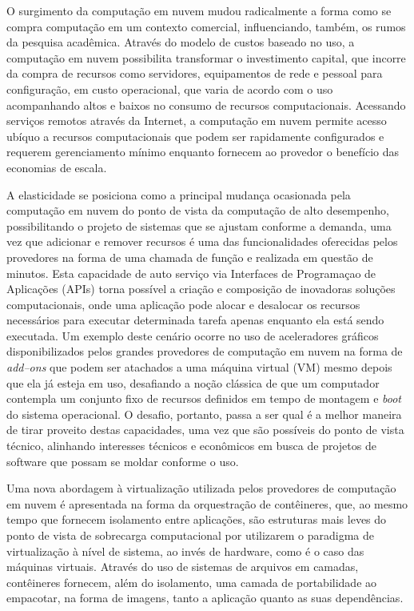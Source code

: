 \documentclass[english,brazilian]{UNISINOSmonografia} %
\begin{document}
O surgimento da computação em nuvem mudou radicalmente a forma como se compra computação em um contexto comercial, influenciando, também, os rumos da pesquisa acadêmica.
Através do modelo de custos baseado no uso, a computação em nuvem possibilita transformar o investimento capital, que incorre da compra de recursos como servidores, equipamentos de rede e pessoal para configuração, em custo operacional, que varia de acordo com o uso acompanhando altos e baixos no consumo de recursos computacionais.
Acessando serviços remotos através da Internet, a computação em nuvem permite acesso ubíquo a recursos computacionais que podem ser rapidamente configurados e requerem gerenciamento mínimo enquanto fornecem ao provedor o benefício das economias de escala.


A elasticidade se posiciona como a principal mudança ocasionada pela computação em nuvem do ponto de vista da computação de alto desempenho, possibilitando o projeto de sistemas que se ajustam conforme a demanda, uma vez que adicionar e remover recursos é uma das funcionalidades oferecidas pelos provedores na forma de uma chamada de função e realizada em questão de minutos.
Esta capacidade de auto serviço via Interfaces de Programaçao de Aplicações (APIs) torna possível a criação e composição de inovadoras soluções computacionais, onde uma aplicação pode alocar e desalocar os recursos necessários para executar determinada tarefa apenas enquanto ela está sendo executada.
Um exemplo deste cenário ocorre no uso de aceleradores gráficos disponibilizados pelos grandes provedores de computação em nuvem na forma de \textit{add--ons} que podem ser atachados a uma máquina virtual (VM) mesmo depois que ela já esteja em uso, desafiando a noção clássica de que um computador contempla um conjunto fixo de recursos definidos em tempo de montagem e \textit{boot} do sistema operacional.
O desafio, portanto, passa a ser qual é a melhor maneira de tirar proveito destas capacidades, uma vez que são possíveis do ponto de vista técnico, alinhando interesses técnicos e econômicos em busca de projetos de software que possam se moldar conforme o uso.


Uma nova abordagem à virtualização utilizada pelos provedores de computação em nuvem é apresentada na forma da orquestração de contêineres, que, ao mesmo tempo que fornecem isolamento entre aplicações, são estruturas mais leves do ponto de vista de sobrecarga computacional por utilizarem o paradigma de virtualização à nível de sistema, ao invés de hardware, como é o caso das máquinas virtuais.
Através do uso de sistemas de arquivos em camadas, contêineres fornecem, além do isolamento, uma camada de portabilidade ao empacotar, na forma de imagens, tanto a aplicação quanto as suas dependências.
\end{document}
